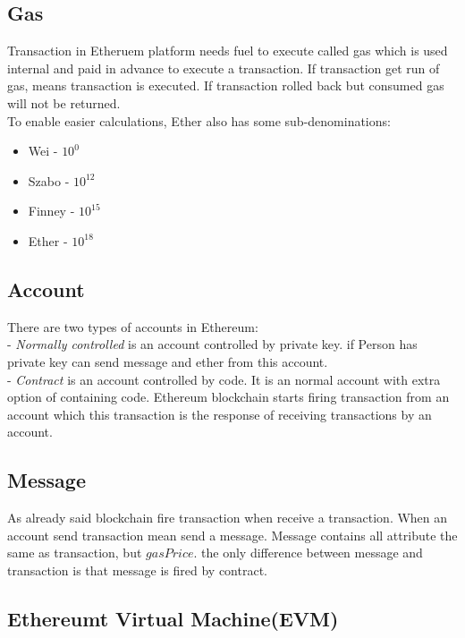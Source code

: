 \subsection{Gas} Transaction in Etheruem platform needs fuel to execute called gas which is used internal and paid in advance to execute a transaction. If transaction get run of gas, means transaction is executed. If transaction rolled back but consumed gas will not be returned.\\
To enable easier calculations, Ether also has some sub-denominations\cite{Egbertsen}:\\
\begin{itemize}
	\item Wei - $10^0$
	\item Szabo - $10^12$
	\item Finney - $10^15$
	\item Ether - $10^18$
\end{itemize}
\subsection{Account}
There are two types of accounts in Ethereum:\\
- \textit{Normally controlled} is an account controlled
by private key. if Person has private key can send message and ether from this account.\\
- \textit{Contract} is an account controlled by code. It is an normal account with extra option of containing code. Ethereum blockchain starts firing transaction from an account which this transaction is the response of receiving transactions by an account\cite{Egbertsen}.
\subsection{Message} As already said blockchain fire transaction when receive a transaction. When an account send transaction mean send a message. Message contains all attribute the same as transaction, but $gasPrice$. the only difference between message and transaction is that message is fired by contract\cite{Egbertsen}.
\subsection{Ethereumt Virtual Machine(EVM)}

